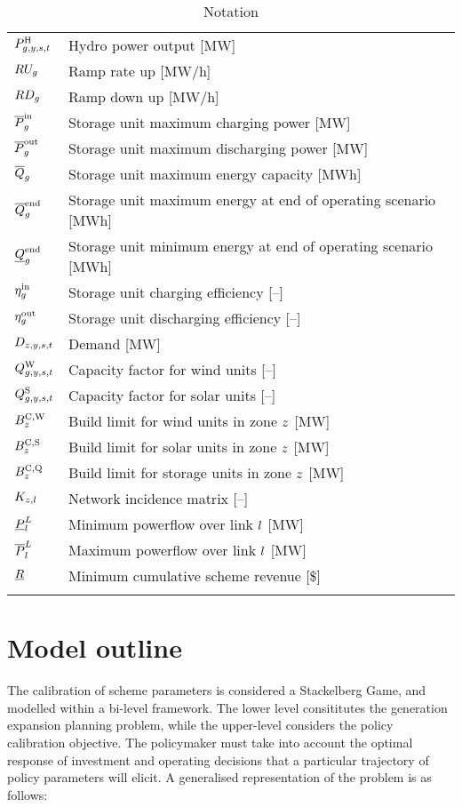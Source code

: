 \documentclass{article}
\begin{document}
\begin{longtable}{ p{}  p{}}
		$P^{\mathrm{H}}_{g,y,s,t}$ & Hydro power output [MW]\\
		$RU_{g}$ & Ramp rate up [MW/h]\\
		$RD_{g}$ & Ramp down up [MW/h]\\
		$\overline{P}^{\mathrm{in}}_{g}$ & Storage unit maximum charging power [MW]\\
		$\overline{P}^{\mathrm{out}}_{g}$ & Storage unit maximum discharging power [MW]\\
		$\overline{Q}_{g}$ & Storage unit maximum energy capacity [MWh]\\
		$\overline{Q}^{\mathrm{end}}_{g}$ & Storage unit maximum energy at end of operating scenario [MWh]\\
		$\underline{Q}^{\mathrm{end}}_{g}$ & Storage unit minimum energy at end of operating scenario [MWh]\\
		$\eta_{g}^{\mathrm{in}}$ & Storage unit charging efficiency [--]\\
		$\eta_{g}^{\mathrm{out}}$ & Storage unit discharging efficiency [--]\\
		$D_{z,y,s,t}$ & Demand [MW]\\
		$Q_{g,y,s,t}^{\mathrm{W}}$ & Capacity factor for wind units [--]\\
		$Q_{g,y,s,t}^{\mathrm{S}}$ & Capacity factor for solar units [--]\\
		$B^{\mathrm{C,\mathrm{W}}}_{z}$ & Build limit for wind units in zone $z$ [MW]\\
		$B^{\mathrm{C,\mathrm{S}}}_{z}$ & Build limit for solar units in zone $z$ [MW]\\
		$B^{\mathrm{C,\mathrm{Q}}}_{z}$ & Build limit for storage units in zone $z$ [MW]\\
		$K_{z,l}$ & Network incidence matrix [--]\\
		$\underline{P}_{l}^{L}$ & Minimum powerflow over link $l$ [MW]\\
		$\overline{P}_{l}^{L}$ & Maximum powerflow over link $l$ [MW]\\
		$\underline{R}$ & Minimum cumulative scheme revenue [\$]\\
		\hline
		\caption{Notation}
	\end{longtable}

\section{Model outline}
The calibration of scheme parameters is considered a Stackelberg Game, and modelled within a bi-level framework. The lower level consititutes the generation expansion planning problem, while the upper-level considers the policy calibration objective. The policymaker must take into account the optimal response of investment and operating decisions that a particular trajectory of policy parameters will elicit. A generalised representation of the problem is as follows:
\end{document}
